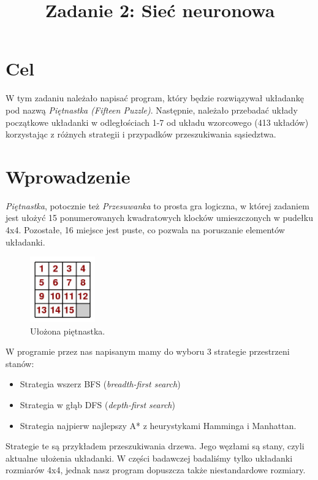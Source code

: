 \documentclass{classrep}
\author{
  \studentinfo{Radosław Grela}{216769} \and
  \studentinfo{Jakub Wąchała}{216914}
}
\title{Zadanie 2: Sieć neuronowa}
\begin{document}
\maketitle

\newpage

\section{Cel} %
W tym zadaniu należało napisać program, który będzie rozwiązywał układankę pod nazwą \textsl{Piętnastka (Fifteen Puzzle)}.
Następnie, należało przebadać układy początkowe układanki w odległościach 1-7 od układu wzorcowego (413 układów)
korzystając z różnych strategii i przypadków przeszukiwania sąsiedztwa.

\section{Wprowadzenie} %
\textsl{Piętnastka}, potocznie też \textsl{Przesuwanka} to prosta gra logiczna, w której zadaniem jest ułożyć 15 ponumerowanych kwadratowych klocków umieszczonych w pudełku 4x4. Pozostałe, 16 miejsce jest puste, co pozwala na poruszanie elementów układanki.\cite{pierwszymath} 
\begin{figure}[h!]
    \centering
    \includegraphics[width=0.25\textwidth]{15grid1.jpg}
    \caption{Ułożona piętnastka. \cite{pierwszymath}}
\end{figure}

W programie przez nas napisanym mamy do wyboru 3 strategie przestrzeni stanów:
\begin{itemize}
\item Strategia wszerz BFS (\textsl{breadth-first search})
\item Strategia w głąb DFS (\textsl{depth-first search})
\item Strategia najpierw najlepszy A* z heurystykami Hamminga i Manhattan.
\end{itemize}
Strategie te są przykładem przeszukiwania drzewa. Jego węzłami są stany, czyli aktualne ułożenia układanki.
W części badawczej badaliśmy tylko układanki rozmiarów 4x4, jednak nasz program dopuszcza także niestandardowe rozmiary.
\end{document}
